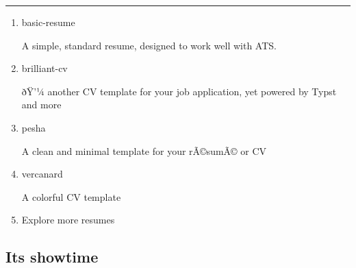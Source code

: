\begin{center}\rule{0.5\linewidth}{0.5pt}\end{center}

\begin{enumerate}
\item
  \href{https://typst.app/universe/package/basic-resume/}{}

  

  basic-resume

  A simple, standard resume, designed to work well with ATS.
\item
  \href{https://typst.app/universe/package/brilliant-cv/}{}

  

  brilliant-cv

  ðŸ'¼ another CV template for your job application, yet powered by
  Typst and more
\item
  \href{https://typst.app/universe/package/pesha/}{}

  

  pesha

  A clean and minimal template for your rÃ©sumÃ© or CV
\item
  \href{https://typst.app/universe/package/vercanard/}{}

  

  vercanard

  A colorful CV template
\item
  \href{/universe/search/?category=cv}{}

  Explore more resumes
\end{enumerate}

\subsection{It\textquotesingle s showtime}\label{its-showtime}

